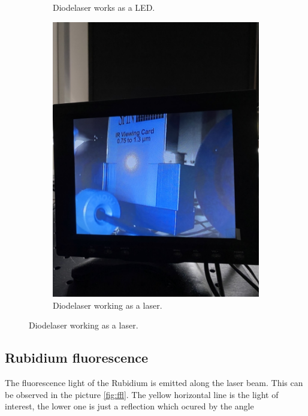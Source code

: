 \begin{figure}
\begin{subfigure}[b]{0.45\textwidth}
        \caption{Diodelaser works as a LED.}
    \end{subfigure}
    \hfill
    \begin{subfigure}[b]{0.45\textwidth}
        \centering
        \includegraphics[width=\textwidth]{beam2.jpeg}
        \caption{Diodelaser working as a laser.}
    \end{subfigure}
\end{figure}

\subsection{Rubidium fluorescence}
The fluorescence light of the Rubidium is emitted along the laser beam. This can be observed in the picture
\ref{fig:ffl}. The yellow horizontal line is the light of interest, the lower one is just a reflection
which ocured by the angle 


